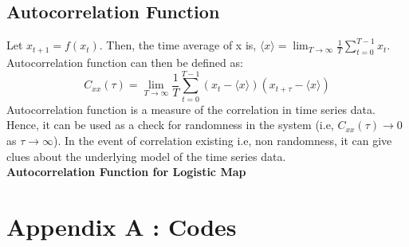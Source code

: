 \documentclass[11pt]{article}
\begin{document}
         \subsection{Autocorrelation Function}
            Let $x_{t+1} = f(x_t)$. Then, the time average of x is, $\langle x \rangle = \lim_{T\to\infty}\frac{1}{T}\sum_{t=0}^{T-1}x_t$. Autocorrelation function can then be defined as:
            $$
               C_{xx}(\tau) = \lim_{T\to\infty}\frac{1}{T} \sum_{t=0}^{T-1}(x_t - \langle x\rangle)(x_{t+\tau} - \langle x\rangle)
            $$
            Autocorrelation function is a measure of the correlation in time series data. Hence, it can be used as a check for randomness in the system (i.e, $C_{xx}(\tau) \to 0$ as $\tau \to \infty$). In the event of correlation existing i.e, non randomness, it can give clues about the underlying model of the time series data.\\[5mm]
            \textbf{Autocorrelation Function for Logistic Map}
      \newpage
      \section*{Appendix A : Codes}
\end{document}
